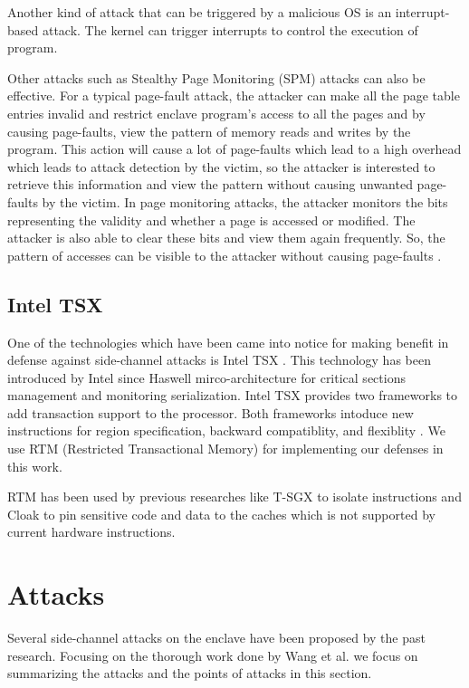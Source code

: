 Another kind of attack that can be triggered by a malicious OS is an interrupt-based attack. The kernel can trigger interrupts to control the execution of program.

Other attacks such as Stealthy Page Monitoring (SPM) attacks \cite{stealthy,leakycauldron} can also be effective. For a typical page-fault attack, the attacker can make all the page table entries invalid and restrict enclave program’s access to all the pages and by causing page-faults, view the pattern of memory reads and writes by the program. This action will cause a lot of page-faults which lead to a high overhead which leads to attack detection by the victim, so the attacker is interested to retrieve this information and view the pattern without causing unwanted page-faults by the victim. In page monitoring attacks, the attacker monitors the bits representing the validity and whether a page is accessed or modified. The attacker is also able to clear these bits and view them again frequently. So, the pattern of accesses can be visible to the attacker without causing page-faults \cite{stealthy,leakycauldron}.

\subsection{Intel TSX}
One of the technologies which have been came into notice for making benefit in defense against side-channel attacks is Intel TSX \cite{tsx}. This technology has been introduced by Intel since Haswell mirco-architecture \cite{haswell} for critical sections management and monitoring serialization. Intel TSX provides two frameworks to add transaction support to the processor. Both frameworks intoduce new instructions for region specification, backward compatiblity, and flexiblity \cite{tsx}. We use RTM (Restricted Transactional Memory) \cite{rtm} for implementing our defenses in this work.

RTM has been used by previous researches like T-SGX \cite{tsgx} to isolate instructions and Cloak \cite{cloak} to pin sensitive code and data to the caches which is not supported by current hardware instructions.





\section{Attacks}
Several side-channel attacks on the enclave have been proposed by the past research. Focusing on the thorough work done by Wang et al. \cite{leakycauldron} we focus on summarizing the attacks and the points of attacks in this section.

